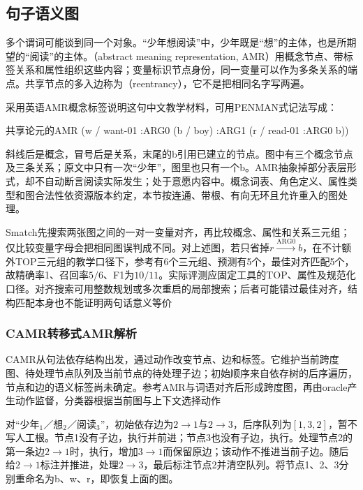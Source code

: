 \subsection{句子语义图}
\label{sec:nlp-analysis-amr}

多个谓词可能谈到同一个对象。“少年想阅读”中，少年既是“想”的主体，也是所期望的“阅读”的主体。（abstract meaning representation, AMR）用概念节点、带标签关系和属性组织这些内容；变量标识节点身份，同一变量可以作为多条关系的端点。共享节点的多入边称为（reentrancy），它不是把相同名字写两遍。

采用英语AMR概念标签说明这句中文教学材料，可用PENMAN式记法写成：
\begin{codeblock}{共享论元的AMR}
(w / want-01
   :ARG0 (b / boy)
   :ARG1 (r / read-01
            :ARG0 b))
\end{codeblock}
斜线后是概念，冒号后是关系，末尾的b引用已建立的节点。图中有三个概念节点及三条关系；原文中只有一次“少年”，图里也只有一个b。AMR抽象掉部分表层形式，却不自动断言阅读实际发生；处于意愿内容中。概念词表、角色定义、属性类型和图合法性依资源版本约定，本节按连通、带根、有向无环且允许重入的图处理。

Smatch先搜索两张图之间的一对一变量对齐，再比较概念、属性和关系三元组；仅比较变量字母会把相同图误判成不同。对上述图，若只省掉$r\xrightarrow{\mathrm{ARG0}}b$，在不计额外TOP三元组的教学口径下，参考有6个三元组、预测有5个，最佳对齐匹配5个，故精确率1、召回率$5/6$、F1为$10/11$。实际评测应固定工具的TOP、属性及规范化口径。对齐搜索可用整数规划或多次重启的局部搜索；后者可能错过最佳对齐，结构匹配本身也不能证明两句话意义等价

\subsubsection{CAMR转移式AMR解析}
\label{sec:nlp-analysis-camr}

CAMR从句法依存结构出发，通过动作改变节点、边和标签。它维护当前跨度图、待处理节点队列及当前节点的待处理子边；初始顺序来自依存树的后序遍历，节点和边的语义标签尚未确定。参考AMR与词语对齐后形成跨度图，再由oracle产生动作监督，分类器根据当前图与上下文选择动作

对“少年$_1$／想$_2$／阅读$_3$”，初始依存边为$2\to1$与$2\to3$，后序队列为$[1,3,2]$，暂不写人工根。节点1没有子边，执行并前进；节点3也没有子边，执行。处理节点2的第一条边$2\to1$时，执行，增加$3\to1$而保留原边；该动作不推进当前子边。随后给$2\to1$标注并推进，处理$2\to3$，最后标注节点2并清空队列。将节点1、2、3分别重命名为b、w、r，即恢复上面的图。

